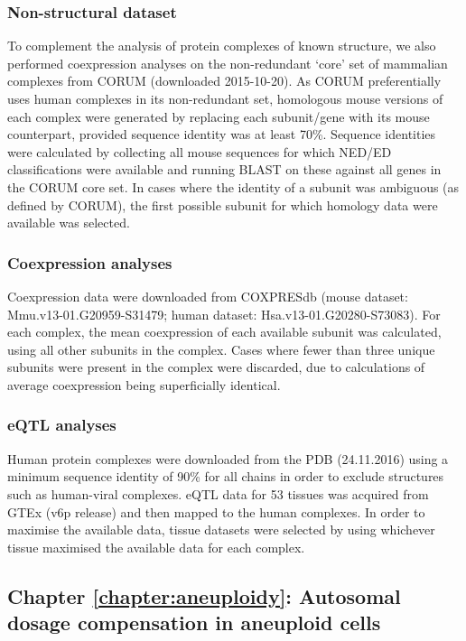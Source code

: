 \documentclass[a4paper,11pt,twoside,openright]{scrbook}
\begin{document}
\subsubsection{Non-structural dataset}
To complement the analysis of protein complexes of known structure, we also performed coexpression analyses on the non-redundant `core' set of mammalian complexes from CORUM \cite{Ruepp2009} (downloaded 2015-10-20). As CORUM preferentially uses human complexes in its non-redundant set, homologous mouse versions of each complex were generated by replacing each subunit/gene with its mouse counterpart, provided sequence identity was at least 70\%. Sequence identities were calculated by collecting all mouse sequences for which NED/ED classifications were available and running BLAST on these against all genes in the CORUM core set. In cases where the identity of a subunit was ambiguous (as defined by CORUM), the first possible subunit for which homology data were available was selected.

\subsubsection{Coexpression analyses}
Coexpression data were downloaded from COXPRESdb \cite{Okamura2014} (mouse dataset: Mmu.v13-01.G20959-S31479; human dataset: Hsa.v13-01.G20280-S73083). For each complex, the mean coexpression of each available subunit was calculated, using all other subunits in the complex. Cases where fewer than three unique subunits were present in the complex were discarded, due to calculations of average coexpression being superficially identical.

\subsubsection{eQTL analyses}
Human protein complexes were downloaded from the PDB (24.11.2016) using a minimum sequence identity of 90\% for all chains in order to exclude structures such as human-viral complexes. eQTL data for 53 tissues was acquired from GTEx (v6p release) and then mapped to the human complexes. In order to maximise the available data, tissue datasets were selected by using whichever tissue maximised the available data for each complex.

\subsection{Chapter \ref*{chapter:aneuploidy}: Autosomal dosage compensation in aneuploid cells}
\end{document}
